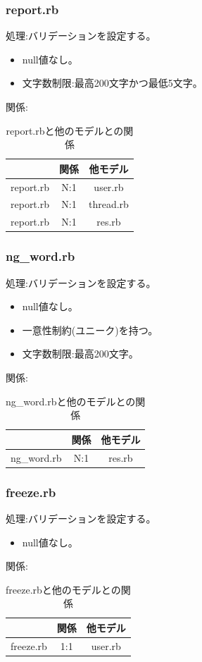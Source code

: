 \documentclass[a4j]{jarticle}
\begin{document}
\subsubsection{report.rb}
\noindent
処理:バリデーションを設定する。
\begin{itemize}
  \item null値なし。
  \item 文字数制限:最高200文字かつ最低5文字。
  \end{itemize}
関係:
\begin{table}[H]
  \centering
  \caption{report.rbと他のモデルとの関係}
  \begin{tabular}{|c|c|c|}\hline
    & 関係 & 他モデル\\ \hline \hline
    report.rb & N:1 & user.rb \\ \hline
    report.rb & N:1 & thread.rb \\ \hline
    report.rb & N:1 & res.rb \\ \hline
  \end{tabular}
\end{table}

\subsubsection{ng\_word.rb}
\noindent
処理:バリデーションを設定する。
\begin{itemize}
  \item null値なし。
  \item 一意性制約(ユニーク)を持つ。
  \item 文字数制限:最高200文字。
\end{itemize}
関係:
\begin{table}[H]
  \centering
  \caption{ng\_word.rbと他のモデルとの関係}
  \begin{tabular}{|c|c|c|}\hline
    & 関係 & 他モデル\\ \hline \hline
    ng\_word.rb & N:1 & res.rb \\ \hline
  \end{tabular}
\end{table}


\subsubsection{freeze.rb}
\noindent
処理:バリデーションを設定する。
\begin{itemize}
  \item null値なし。
\end{itemize}
関係:
\begin{table}[H]
  \centering
  \caption{freeze.rbと他のモデルとの関係}
  \begin{tabular}{|c|c|c|}\hline
    & 関係 & 他モデル\\ \hline \hline
    freeze.rb & 1:1 & user.rb \\ \hline
  \end{tabular}
\end{table}
\end{document}
